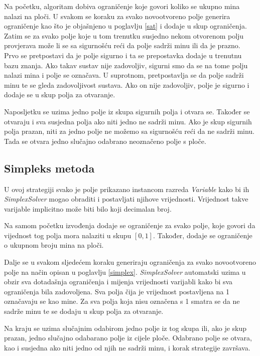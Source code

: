 \documentclass{article}
\numberwithin{figure}{section}
\numberwithin{table}{section}
\begin{document}
Na početku, algoritam dobiva ograničenje koje govori koliko se ukupno mina nalazi na ploči.
U svakom se koraku za svako novootvoreno polje generira ograničenje kao što je objašnjeno u
poglavlju \ref{sat} i dodaje u skup ograničenja. Zatim se za svako polje koje u tom trenutku
susjedno nekom otvorenom polju provjerava može li se sa sigurnošću reći da polje sadrži minu ili da
je prazno. Prvo se pretpostavi da je polje sigurno i ta se prepostavka dodaje u trenutnu bazu
znanja. Ako takav sustav nije zadovoljiv, sigurni smo da se na tome polju nalazi mina i polje se
označava. U suprotnom, pretpostavlja se da polje sadrži minu te se gleda zadovoljivost sustava. Ako on
nije zadovoljiv, polje je sigurno i dodaje se u skup polja za otvaranje.

Naposljetku se uzima jedno polje iz skupa sigurnih polja i otvara se. Također se otvaraju i sva susjedna polja ako niti jedno ne sadrži minu. Ako je skup sigurnih polja prazan, niti za jedno polje ne možemo sa sigurnošću reći da ne sadrži minu. Tada se otvara jedno slučajno odabrano neoznačeno polje s ploče.

\subsection{Simpleks metoda}

U ovoj strategiji svako je polje prikazano instancom razreda \textit{Variable} kako bi ih \textit{SimplexSolver} mogao obraditi i postavljati njihove vrijednosti. Vrijednost takve varijable implicitno može biti bilo koji decimalan broj.

Na samom početku izvođenja dodaje se ograničenje za svako polje, koje govori da vijednost tog polja mora nalaziti u skupu $[0, 1]$. Također, dodaje se ograničenje o ukupnom broju mina na ploči.

Dalje se u svakom sljedećem koraku generiraju ograničenja za svako novootvoreno polje na način opisan u poglavlju \ref{simplex}.
\textit{SimplexSolver} automatski uzima u obzir sva dotadašnja ograničenja i mijenja vrijednosti varijabli kako bi sva ograničenja bila zadovoljena. Sva polja čija je vrijednost postavljena na 1 označavaju se kao mine. Za sva polja koja nisu označena s 1 smatra se da ne sadrže minu te se dodaju u skup polja za otvaranje.

Na kraju se uzima slučajnim odabirom jedno polje iz tog skupa ili, ako je skup prazan, jedno slučajno odabarano polje iz cijele ploče. Odabrano polje se otvara, kao i susjedna ako niti jedno od njih ne sadrži minu, i korak strategije završava.
\end{document}
